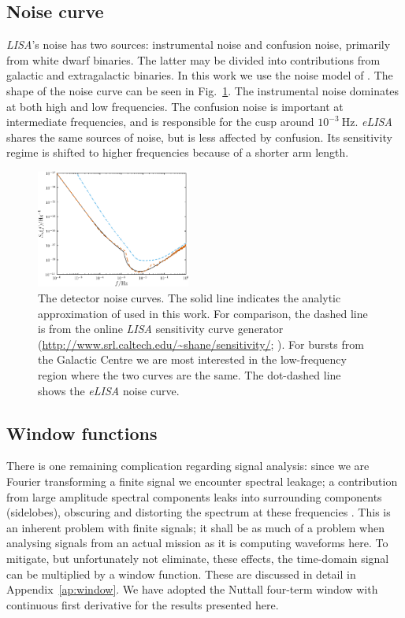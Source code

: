 \documentclass[useAMS,usedcolumn,usegraphicx,usenatbib]{mn2e}
\newcommand{\figref}[1]{Fig.~\ref{fig:#1}}
\newcommand{\apref}[1]{Appendix~\ref{ap:#1}}
\newcommand{\units}[1]{\ensuremath{~\mathrm{#1}}}
\begin{document}
\subsection{Noise curve}\label{sec:Noise}

\textit{LISA}'s noise has two sources: instrumental noise and confusion noise, primarily from white dwarf binaries. The latter may be divided into contributions from galactic and extragalactic binaries. In this work we use the noise model of \citet{Barack2004}. The shape of the noise curve can be seen in \figref{Noise}. The instrumental noise dominates at both high and low frequencies. The confusion noise is important at intermediate frequencies, and is responsible for the cusp around $10^{-3}\units{Hz}$. \textit{eLISA} shares the same sources of noise, but is less affected by confusion. Its sensitivity regime is shifted to higher frequencies because of a shorter arm length.
\begin{figure}
\begin{center}
\includegraphics[width=0.45\textwidth]{Fig_Noise}
\caption{The detector noise curves. The solid line indicates the analytic approximation of \citet{Barack2004} used in this work. For comparison, the dashed line is from the online \textit{LISA} sensitivity curve generator (\url{http://www.srl.caltech.edu/~shane/sensitivity/}; \citealt*{Larson2000, Larson2002}). For bursts from the Galactic Centre we are most interested in the low-frequency region where the two curves are the same. The dot-dashed line shows the \textit{eLISA} noise curve.}
\label{fig:Noise}
\end{center}
\end{figure}

\subsection{Window functions}

There is one remaining complication regarding signal analysis: since we are Fourier transforming a finite signal we encounter spectral leakage; a contribution from large amplitude spectral components leaks into surrounding components (sidelobes), obscuring and distorting the spectrum at these frequencies \citep{Harris1978}. This is an inherent problem with finite signals; it shall be as much of a problem when analysing signals from an actual mission as it is computing waveforms here. To mitigate, but unfortunately not eliminate, these effects, the time-domain signal can be multiplied by a window function. These are discussed in detail in \apref{window}. We have adopted the Nuttall four-term window with continuous first derivative \citep{Nuttall1981} for the results presented here.
\end{document}
